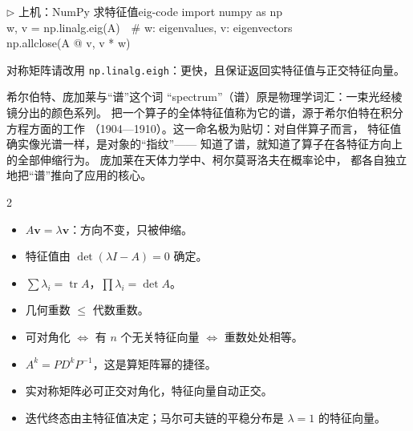 \documentclass[11pt,a4paper,openany]{ctexbook}
\DeclareMathOperator{\tr}{tr}
\begin{document}
\begin{remk}{$\triangleright$ 上机：NumPy 求特征值}{eig-code}
{\small\ttfamily
import numpy as np\\
w, v = np.linalg.eig(A)\ \ \# w: eigenvalues, v: eigenvectors\\
np.allclose(A @ v, v * w)}
\par\smallskip
\noindent 对称矩阵请改用 \texttt{np.linalg.eigh}：更快，且保证返回实特征值与正交特征向量。
\end{remk}

\begin{sidebar}{希尔伯特、庞加莱与“谱”这个词}
“spectrum”（谱）原是物理学词汇：一束光经棱镜分出的颜色系列。
把一个算子的全体特征值称为它的谱，源于希尔伯特在积分方程方面的工作
（1904—1910）。这一命名极为贴切：对自伴算子而言，
特征值确实像光谱一样，是对象的“指纹”——
知道了谱，就知道了算子在各特征方向上的全部伸缩行为。
庞加莱在天体力学中、柯尔莫哥洛夫在概率论中，
都各自独立地把“谱”推向了应用的核心。
\end{sidebar}

\begin{chapkeys}
\small
\begin{multicols}{2}
\begin{itemize}[leftmargin=1.5em, itemsep=2pt]
\item $A\boldsymbol{v}=\lambda\boldsymbol{v}$：方向不变，只被伸缩。
\item 特征值由 $\det(\lambda I-A)=0$ 确定。
\item $\sum\lambda_i=\tr A$，$\prod\lambda_i=\det A$。
\item 几何重数 $\le$ 代数重数。
\item 可对角化 $\Leftrightarrow$ 有 $n$ 个无关特征向量 $\Leftrightarrow$ 重数处处相等。
\item $A^k=PD^kP^{-1}$，这是算矩阵幂的捷径。
\item 实对称矩阵必可正交对角化，特征向量自动正交。
\item 迭代终态由主特征值决定；马尔可夫链的平稳分布是 $\lambda=1$ 的特征向量。
\end{itemize}
\end{multicols}
\end{chapkeys}
\end{document}
